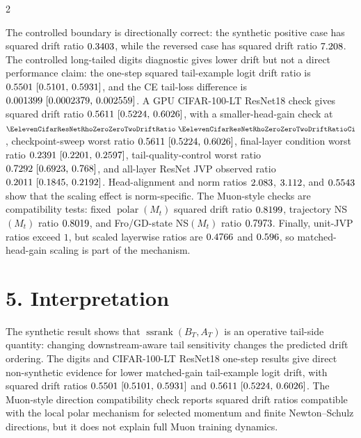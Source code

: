 \documentclass[10pt]{article}
\newcommand{\ssrank}{\operatorname{ssrank}}
\newcommand{\polar}{\operatorname{polar}}
\begin{document}
\begin{multicols}{2}
\begin{sloppypar}
The controlled boundary is directionally correct: the synthetic positive case has squared drift ratio \(0.3403\), while the reversed case has squared drift ratio \(7.208\). The controlled long-tailed digits diagnostic gives lower drift but not a direct performance claim: the one-step squared tail-example logit drift ratio is \(0.5501 ~\text{[0.5101,\hspace{0.35em}0.5931]}\), and the CE tail-loss difference is \(0.001399 ~\text{[0.0002379,\hspace{0.35em}0.002559]}\). A GPU CIFAR-100-LT ResNet18 check gives squared drift ratio \(0.5611 ~\text{[0.5224,\hspace{0.35em}0.6026]}\), with a smaller-head-gain check at \(\EelevenCifarResNetRhoZeroZeroTwoDriftRatio ~\EelevenCifarResNetRhoZeroZeroTwoDriftRatioCi\), checkpoint-sweep worst ratio \(0.5611 ~\text{[0.5224,\hspace{0.35em}0.6026]}\), final-layer condition worst ratio \(0.2391 ~\text{[0.2201,\hspace{0.35em}0.2597]}\), tail-quality-control worst ratio \(0.7292 ~\text{[0.6923,\hspace{0.35em}0.768]}\), and all-layer ResNet JVP observed ratio \(0.2011 ~\text{[0.1845,\hspace{0.35em}0.2192]}\). Head-alignment and norm ratios \(2.083\), \(3.112\), and \(0.5543\) show that the scaling effect is norm-specific. The Muon-style checks are compatibility tests: fixed \(\polar(M_t)\) squared drift ratio \(0.8199\), trajectory NS\((M_t)\) ratio \(0.8019\), and Fro/GD-state NS\((M_t)\) ratio \(0.7973\). Finally, unit-JVP ratios exceed \(1\), but scaled layerwise ratios are \(0.4766\) and \(0.596\), so matched-head-gain scaling is part of the mechanism.
\end{sloppypar}

{\raggedright
\section*{5. Interpretation}
The synthetic result shows that \(\ssrank(B_T,A_T)\) is an operative tail-side quantity: changing downstream-aware tail sensitivity changes the predicted drift ordering. The digits and CIFAR-100-LT ResNet18 one-step results give direct non-synthetic evidence for lower matched-gain tail-example logit drift, with squared drift ratios \(0.5501 ~\text{[0.5101,\hspace{0.35em}0.5931]}\) and \(0.5611 ~\text{[0.5224,\hspace{0.35em}0.6026]}\). The Muon-style direction compatibility check reports squared drift ratios compatible with the local polar mechanism for selected momentum and finite Newton--Schulz directions, but it does not explain full Muon training dynamics.

}
\end{multicols}
\end{document}
